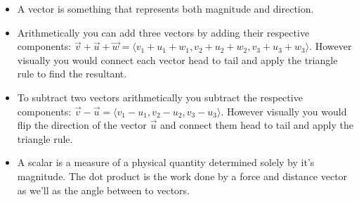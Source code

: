 \begin{itemize}
    \item A vector is something that represents both magnitude and direction.
    \item  Arithmetically you can add three vectors by adding their respective components: $\vec{v} + \vec{u} + \vec{w} = \langle v_1 + u_1 + w_1, v_2 + u_2 + w_2, v_3 + u_3 + w_3 \rangle$. However visually you would connect each vector head to tail and apply the triangle rule to find the resultant. 
    \item To subtract two vectors arithmetically you subtract the respective components: $\vec{v} - \vec{u} = \langle v_1 - u_1, v_2 - u_2, v_3 - u_3 \rangle$. However visually you would flip the direction of the vector $\vec{u}$ and connect them head to tail and apply the triangle rule.
    \item A scalar is a measure of a physical quantity determined solely by it's magnitude. The dot product is the work done by a force and distance vector as we'll as the angle between to vectors.
\end{itemize}
